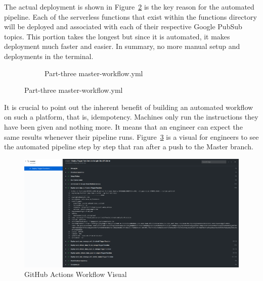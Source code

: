 \documentclass{article}
\begin{document}
The actual deployment is shown in Figure~\ref{fig:workflow-file-three} is the key reason for the automated pipeline. Each of the serverless functions that exist within the functions directory will be deployed and associated with each of their respective Google PubSub topics. This portion takes the longest but since it is automated, it makes deployment much faster and easier. In summary, no more manual setup and deployments in the terminal.

\begin{figure}[H]
	\begin{figure}[H]
		
		\caption{Part-three master-workflow.yml}
		\label{fig:workflow-file-three}
	\end{figure}
\end{figure}

It is crucial to point out the inherent benefit of building an automated workflow on such a platform, that is, idempotency. Machines only run the instructions they have been given and nothing more. It means that an engineer can expect the same results whenever their pipeline runs. Figure~\ref{fig:workflow-visual} is a visual for engineers to see the automated pipeline step by step that ran after a push to the Master branch.\\

\begin{figure}[H]
	\center
	\includegraphics[width=\textwidth]{images/github-actions.png}
	\caption{GitHub Actions Workflow Visual}
	\label{fig:workflow-visual}
\end{figure}
\end{document}
